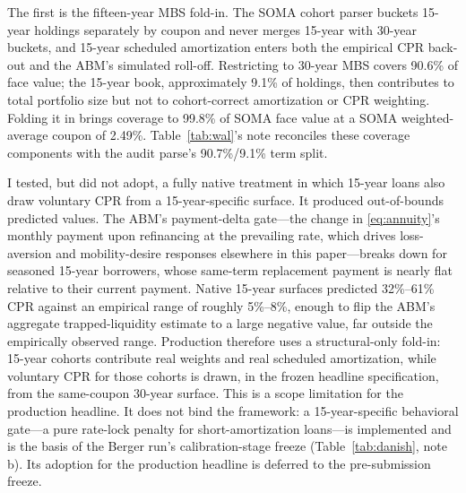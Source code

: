 \documentclass[12pt]{article}
\begin{document}
The first is the fifteen-year MBS fold-in. The SOMA cohort parser buckets 15-year holdings separately by coupon and never merges 15-year with 30-year buckets, and 15-year scheduled amortization enters both the empirical CPR back-out and the ABM's simulated roll-off. Restricting to 30-year MBS covers 90.6\% of face value; the 15-year book, approximately 9.1\% of holdings, then contributes to total portfolio size but not to cohort-correct amortization or CPR weighting. Folding it in brings coverage to 99.8\% of SOMA face value at a SOMA weighted-average coupon of 2.49\%. Table~\ref{tab:wal}'s note reconciles these coverage components with the audit parse's 90.7\%/9.1\% term split.

I tested, but did not adopt, a fully native treatment in which 15-year loans also draw voluntary CPR from a 15-year-specific surface. It produced out-of-bounds predicted values. The ABM's payment-delta gate---the change in \eqref{eq:annuity}'s monthly payment upon refinancing at the prevailing rate, which drives loss-aversion and mobility-desire responses elsewhere in this paper---breaks down for seasoned 15-year borrowers, whose same-term replacement payment is nearly flat relative to their current payment. Native 15-year surfaces predicted 32\%--61\% CPR against an empirical range of roughly 5\%--8\%, enough to flip the ABM's aggregate trapped-liquidity estimate to a large negative value, far outside the empirically observed range. Production therefore uses a structural-only fold-in: 15-year cohorts contribute real weights and real scheduled amortization, while voluntary CPR for those cohorts is drawn, in the frozen headline specification, from the same-coupon 30-year surface. This is a scope limitation for the production headline. It does not bind the framework: a 15-year-specific behavioral gate---a pure rate-lock penalty for short-amortization loans---is implemented and is the basis of the Berger run's calibration-stage freeze (Table~\ref{tab:danish}, note b). Its adoption for the production headline is deferred to the pre-submission freeze.
\end{document}

